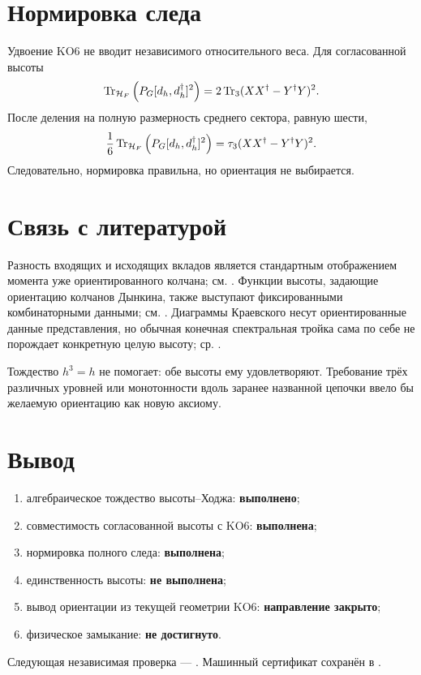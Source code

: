 \section{Нормировка следа}

Удвоение KO6 не вводит независимого относительного веса. Для согласованной
высоты
\begin{equation}
 \operatorname{Tr}_{\mathcal H_F}\left(P_G[d_h,d_h^\dagger]^2\right)
 =2\operatorname{Tr}_3(XX^\dagger-Y^\dagger Y)^2.
\end{equation}
После деления на полную размерность среднего сектора, равную шести,
\begin{equation}
 \frac16\operatorname{Tr}_{\mathcal H_F}\left(P_G[d_h,d_h^\dagger]^2\right)
 =\tau_3(XX^\dagger-Y^\dagger Y)^2.
\end{equation}
Следовательно, нормировка правильна, но ориентация не выбирается.

\section{Связь с литературой}

Разность входящих и исходящих вкладов является стандартным отображением
момента уже ориентированного колчана; см. . Функции
высоты, задающие ориентацию колчанов Дынкина, также выступают фиксированными
комбинаторными данными; см. . Диаграммы Краевского
несут ориентированные данные представления, но обычная конечная спектральная
тройка сама по себе не порождает конкретную целую высоту; ср.
.

\begin{nogocriterion}
Тождество \(h^3=h\) не помогает: обе высоты ему удовлетворяют. Требование
трёх различных уровней или монотонности вдоль заранее названной цепочки
ввело бы желаемую ориентацию как новую аксиому.
\end{nogocriterion}

\section{Вывод}

\begin{protocol}
\begin{enumerate}
 \item алгебраическое тождество высоты--Ходжа: \textbf{выполнено};
 \item совместимость согласованной высоты с KO6: \textbf{выполнена};
 \item нормировка полного следа: \textbf{выполнена};
 \item единственность высоты: \textbf{не выполнена};
 \item вывод ориентации из текущей геометрии KO6:
 \textbf{направление закрыто};
 \item физическое замыкание: \textbf{не достигнуто}.
\end{enumerate}
\end{protocol}

Следующая независимая проверка ---
.
Машинный сертификат сохранён в
.